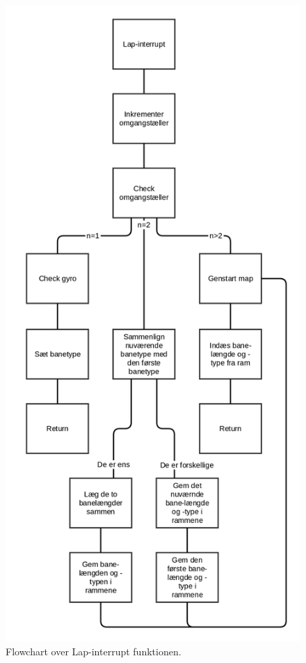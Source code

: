 \begin{figure}[hbtp]
\centering
\includegraphics[scale=0.12]{Billeder/lap_interrupt.png}
\caption{Flowchart over Lap-interrupt funktionen.}
\label{fig:Lap Flowchart}
\end{figure}